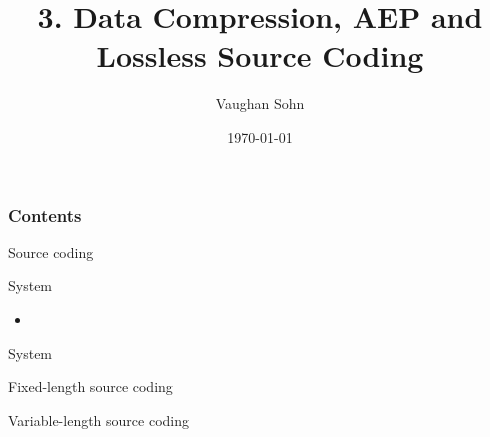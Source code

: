 \documentclass[9pt]{beamer}
\title{3. Data Compression, AEP and Lossless Source Coding}
\date{\today}
\author{Vaughan Sohn}
\begin{document}
    \maketitle
    
    \begin{frame}
        \frametitle{Contents}
        \tableofcontents
    \end{frame}

    
    \begin{section}{Source coding}
        \begin{frame}{System}
            \begin{itemize}
                \item 
            \end{itemize}
        \end{frame}

        \begin{frame}{System}
            \begin{definition}
                
            \end{definition}
        \end{frame}

        \begin{frame}{Fixed-length source coding}
            \begin{definition}
                
            \end{definition}
        \end{frame}

        \begin{frame}{Variable-length source coding}
            \begin{definition}
                
            \end{definition}
        \end{frame}

    \end{section}
\end{document}
